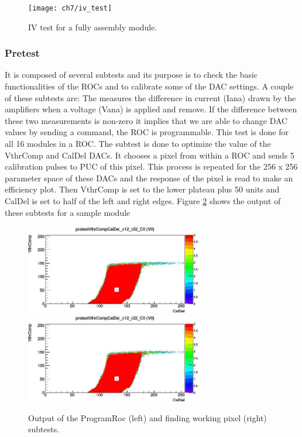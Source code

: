 \begin{figure}[!h]
  \centering
  \texttt{[image: ch7/iv\_test]}
  \caption[IV results of a module]{IV test for a fully assembly module.}\label{fig:iv_test}
\end{figure}

\subsubsection{Pretest}
It is composed of several subtests and its purpose is to check the basic functionalities of the ROCs and to calibrate some of the DAC {} settings. A couple of these subtests are: The  measures the difference in current (Iana) drawn by the amplifiers when a voltage (Vana) is applied and remove. 
If the difference between these two measurements is non-zero it implies that we are able to change DAC values by sending a command, the ROC is programmable. This test is done for all 16 modules in a ROC. The  subtest is done to optimize the value of the VthrComp and CalDel DACs. It chooses a pixel from within a ROC and sends 5 calibration pulses to PUC of this pixel. This process is repeated for the 256 x 256 parameter space of these DACs and the response of the pixel is read to make an efficiency plot. Then VthrComp is set to the lower plateau plus 50 units and CalDel is set to half of the left and right edges. Figure \ref{fig:pretest} shows the output of these subtests for a sample module

\begin{figure}[!h]
  \centering
  \includegraphics[width=0.7\textwidth]{../images/ch7/working_point}
  \includegraphics[width=0.7\textwidth]{../images/ch7/working_point}
  \caption[Programable ROC and working point]{Output of the ProgramRoc (left) and finding working pixel (right) subtests.}\label{fig:pretest}
\end{figure}

